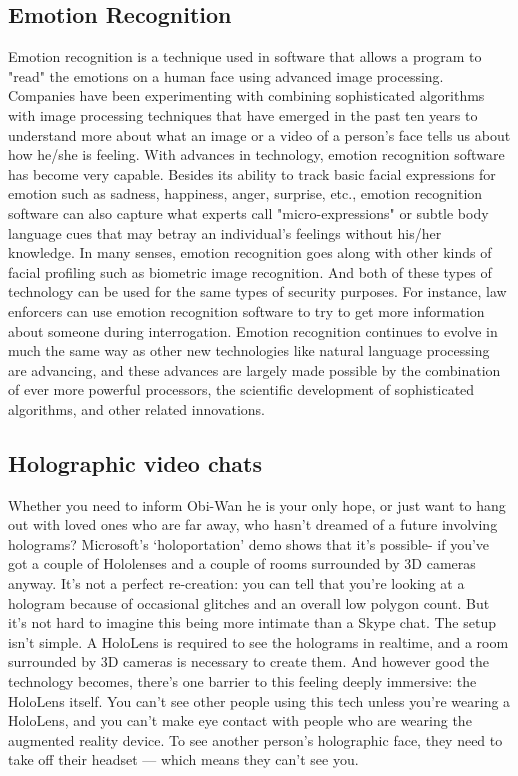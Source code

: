 \documentclass[12pt,a4paper]{article}
\begin{document}
\subsection{Emotion Recognition}
\par
Emotion recognition is a technique used in software that allows a program to "read" the emotions on a human face using advanced image processing. Companies have been experimenting with combining sophisticated algorithms with image processing techniques that have emerged in the past ten years to understand more about what an image or a video of a person's face tells us about how he/she is feeling.
With advances in technology, emotion recognition software has become very capable. Besides its ability to track basic facial expressions for emotion such as sadness, happiness, anger, surprise, etc., emotion recognition software can also capture what experts call "micro-expressions" or subtle body language cues that may betray an individual’s feelings without his/her knowledge.
In many senses, emotion recognition goes along with other kinds of facial profiling such as biometric image recognition. And both of these types of technology can be used for the same types of security purposes. For instance, law enforcers can use emotion recognition software to try to get more information about someone during interrogation. Emotion recognition continues to evolve in much the same way as other new technologies like natural language processing are advancing, and these advances are largely made possible by the combination of ever more powerful processors, the scientific development of sophisticated algorithms, and other related innovations.

\subsection{Holographic video chats}\par
Whether you need to inform Obi-Wan he is your only hope, or just want to hang out with loved ones who are far away, who hasn’t dreamed of a future involving holograms? Microsoft’s ‘holoportation’ demo shows that it’s possible- if you’ve got a couple of Hololenses and a couple of rooms surrounded by 3D cameras anyway. 
It’s not a perfect re-creation: you can tell that you’re looking at a hologram because of occasional glitches and an overall low polygon count. But it’s not hard to imagine this being more intimate than a Skype chat.
The setup isn’t simple. A HoloLens is required to see the holograms in realtime, and a room surrounded by 3D cameras is necessary to create them. And however good the technology becomes, there’s one barrier to this feeling deeply immersive: the HoloLens itself.
You can’t see other people using this tech unless you’re wearing a HoloLens, and you can’t  make eye contact with people who are wearing the augmented reality device.  To see another person’s holographic face, they need to take off their headset — which means they can’t see you.
 
\end{document}
